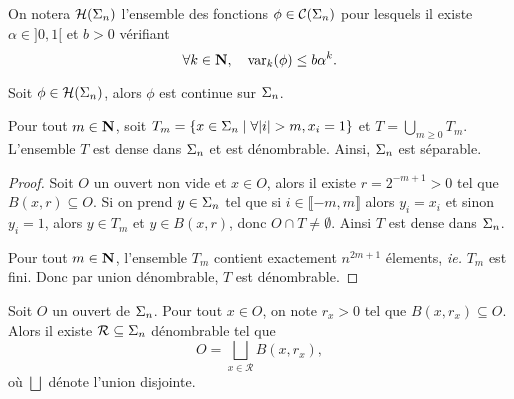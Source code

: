   \begin{definition}
    \label{def:holder_fn_set}
    \leanok
    On notera $\mathcal{H} (\Sigma_{n})$ l'ensemble des fonctions $\phi \in \mathcal{C} (\Sigma_{n})$ pour lesquels il existe $\alpha \in ]0, 1[$ et $b > 0$ vérifiant
    $$\forall k \in \mathbf N, \hspace{1em} \operatorname{var}_k(\phi) \leq b\alpha^k.$$
  \end{definition}

  \begin{proposition}
    \label{prop:holder_imp_continous}
    \leanok
    Soit $\phi \in \mathcal{H} (\Sigma_{n})$, alors $\phi$ est continue sur $\Sigma_n$.
  \end{proposition}


  \begin{proposition}
    \label{prop:separable}
    \leanok
    Pour tout $m \in \mathbf N$, soit $T_m = \left\{x \in \s_n \mid \forall|i|>m, x_i=1\right\}$ et $T = \bigcup_{m\geq 0}{T_m}$.
    L'ensemble $T$ est dense dans $\Sigma_n$ et est dénombrable. Ainsi, $\Sigma_n$ est séparable.
  \end{proposition}

  \begin{proof}
    Soit $O$ un ouvert non vide et $x \in O$, alors il existe $r = 2^{-m+1} > 0$ tel que $B(x, r) \subseteq O$.
    Si on prend $y \in \Sigma_n$ tel que si $i \in \llbracket -m, m \rrbracket$ alors $y_i = x_i$ et sinon $y_i = 1$,
    alors $y \in T_m$ et $y \in B(x, r)$, donc $O \cap T \not= \emptyset$. Ainsi $T$ est dense dans $\Sigma_n$.

    Pour tout $m \in \mathbf N$, l'ensemble $T_m$ contient exactement $n^{2m+1}$ élements, \textit{ie.} $T_m$ est fini.
    Donc par union dénombrable, $T$ est dénombrable.
  \end{proof}

  \begin{proposition}
    \label{prop:boules}
    \leanok
    Soit $O$ un ouvert de $\Sigma_n$. Pour tout $x \in O$, on note $r_x > 0$ tel que $B(x, r_x) \subseteq O$.
    Alors il existe $\mathcal R \subseteq \Sigma_n$ dénombrable tel que
    $$O = \bigsqcup_{x\in\mathcal R}{B(x, r_x)},$$
    où $\bigsqcup$ dénote l'union disjointe.
  \end{proposition}

